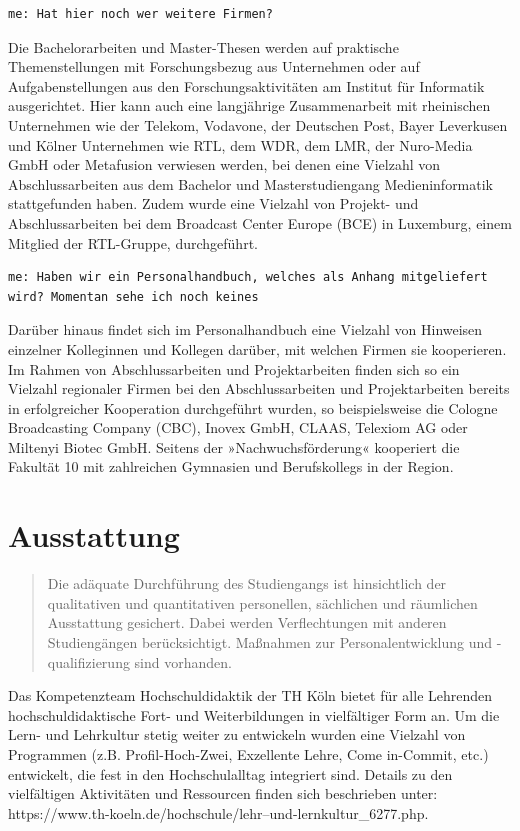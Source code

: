 \begin{verbatim}
me: Hat hier noch wer weitere Firmen?
\end{verbatim}

Die Bachelorarbeiten und Master-Thesen werden auf praktische
Themenstellungen mit Forschungsbezug aus Unternehmen oder auf
Aufgabenstellungen aus den Forschungsaktivitäten am Institut für
Informatik ausgerichtet. Hier kann auch eine langjährige Zusammenarbeit
mit rheinischen Unternehmen wie der Telekom, Vodavone, der Deutschen
Post, Bayer Leverkusen und Kölner Unternehmen wie RTL, dem WDR, dem LMR,
der Nuro-Media GmbH oder Metafusion verwiesen werden, bei denen eine
Vielzahl von Abschlussarbeiten aus dem Bachelor und Masterstudiengang
Medieninformatik stattgefunden haben. Zudem wurde eine Vielzahl von
Projekt- und Abschlussarbeiten bei dem Broadcast Center Europe (BCE) in
Luxemburg, einem Mitglied der RTL-Gruppe, durchgeführt.

\begin{verbatim}
me: Haben wir ein Personalhandbuch, welches als Anhang mitgeliefert wird? Momentan sehe ich noch keines
\end{verbatim}

Darüber hinaus findet sich im Personalhandbuch eine Vielzahl von
Hinweisen einzelner Kolleginnen und Kollegen darüber, mit welchen Firmen
sie kooperieren. Im Rahmen von Abschlussarbeiten und Projektarbeiten
finden sich so ein Vielzahl regionaler Firmen bei den Abschlussarbeiten
und Projektarbeiten bereits in erfolgreicher Kooperation durchgeführt
wurden, so beispielsweise die Cologne Broadcasting Company (CBC), Inovex
GmbH, CLAAS, Telexiom AG oder Miltenyi Biotec GmbH. Seitens der
»Nachwuchsförderung« kooperiert die Fakultät 10 mit zahlreichen
Gymnasien und Berufskollegs in der Region.

\chapter{Ausstattung}\label{ausstattung}

\begin{quote}
Die adäquate Durchführung des Studiengangs ist hinsichtlich der
qualitativen und quantitativen personellen, sächlichen und räumlichen
Ausstattung gesichert. Dabei werden Verflechtungen mit anderen
Studiengängen berücksichtigt. Maßnahmen zur Personalentwicklung und
-qualifizierung sind vorhanden.
\end{quote}

Das Kompetenzteam Hochschuldidaktik der TH Köln bietet für alle
Lehrenden hochschuldidaktische Fort- und Weiterbildungen in vielfältiger
Form an. Um die Lern- und Lehrkultur stetig weiter zu entwickeln wurden
eine Vielzahl von Programmen (z.B. Profil-Hoch-Zwei, Exzellente Lehre,
Come in-Commit, etc.) entwickelt, die fest in den Hochschulalltag
integriert sind. Details zu den vielfältigen Aktivitäten und Ressourcen
finden sich beschrieben unter:
https://www.th-koeln.de/hochschule/lehr--und-lernkultur\_6277.php.

